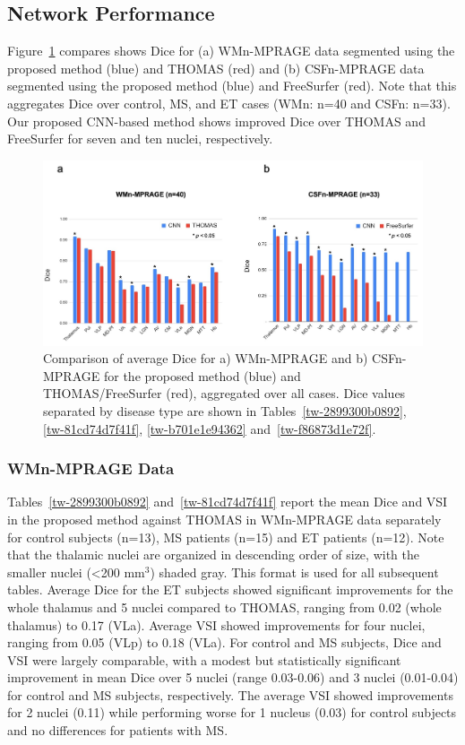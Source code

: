\subsection{Network Performance}Figure~\ref{f-1b1c9f8fc2d4} compares shows Dice for (a) WMn-MPRAGE data segmented using the proposed method (blue) and THOMAS (red) and (b) CSFn-MPRAGE data segmented using the proposed method (blue) and FreeSurfer (red). Note that this aggregates Dice over control, MS, and ET cases (WMn: n=40 and CSFn: n=33). Our proposed CNN-based method shows improved Dice over THOMAS and FreeSurfer for seven and ten nuclei, respectively. 
\bgroup
{}
\begin{figure}[!htbp]
\centering \includegraphics{Thalamus/images/slide3.jpeg}
\makeatother 
\caption{Comparison of average Dice for a) WMn-MPRAGE and b) CSFn-MPRAGE for the proposed method (blue) and THOMAS/FreeSurfer (red), aggregated over all cases. Dice values separated by disease type are shown in Tables~\ref{tw-2899300b0892}, \ref{tw-81cd74d7f41f}, \ref{tw-b701e1e94362} and~\ref{tw-f86873d1e72f}.}
\label{f-1b1c9f8fc2d4}
\end{figure}
\egroup




\subsubsection{WMn-MPRAGE Data}Tables~\ref{tw-2899300b0892} and~\ref{tw-81cd74d7f41f} report the mean Dice and VSI in the proposed method against THOMAS in WMn-MPRAGE data separately for control subjects (n=13), MS patients (n=15) and ET patients (n=12). Note that the thalamic nuclei are organized in descending order of size, with the smaller nuclei ({\textless}200 mm\ensuremath{^{3}}) shaded gray. This format is used for all subsequent tables. Average Dice for the ET subjects showed significant improvements for the whole thalamus and 5 nuclei compared to THOMAS, ranging from 0.02 (whole thalamus) to 0.17 (VLa). Average VSI showed improvements for four nuclei, ranging from 0.05 (VLp) to 0.18 (VLa). For control and MS subjects, Dice and VSI were largely comparable, with a modest but statistically significant improvement in mean Dice over 5 nuclei (range 0.03-0.06) and 3 nuclei (0.01-0.04) for control and MS subjects, respectively. The average VSI showed improvements for 2 nuclei (0.11) while performing worse for 1 nucleus (0.03) for control subjects and no differences for patients with MS.

